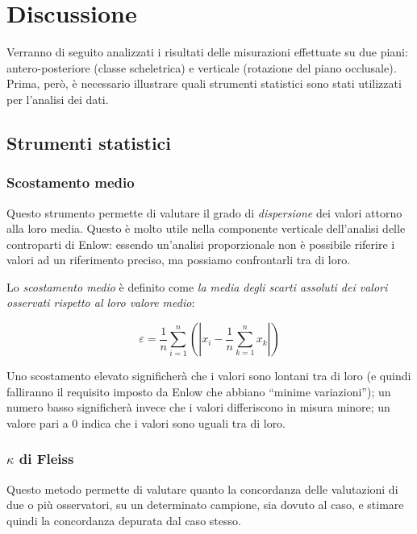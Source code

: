 \chapter{Discussione}
Verranno di seguito analizzati i risultati delle misurazioni effettuate su due piani:  antero-posteriore (classe scheletrica) e verticale (rotazione del piano occlusale). Prima, però, è necessario illustrare quali strumenti statistici sono stati utilizzati per l'analisi dei dati.

\section{Strumenti statistici}
\subsection*{Scostamento medio}
\label{scostamento_medio}
Questo strumento permette di valutare il grado di \emph{dispersione} dei valori attorno alla loro media. Questo è molto utile nella componente verticale dell'analisi delle controparti di Enlow: essendo un'analisi proporzionale non è possibile riferire i valori ad un riferimento preciso, ma possiamo confrontarli tra di loro.

Lo \emph{scostamento medio} è definito come \emph{la media degli scarti assoluti dei valori osservati rispetto al loro valore medio}:

\begin{equation}
\label{eq:scostamento_medio}
\varepsilon = \frac{1}{n}\sum_{i=1}^n{\left(\left|x_i - \frac{1}{n}\sum_{k=1}^n x_k\right|\right)}
\end{equation}

Uno scostamento elevato significherà che i valori sono lontani tra di loro (e quindi falliranno il requisito imposto da Enlow che abbiano ``minime variazioni''); un numero basso significherà invece che i valori differiscono in misura minore; un valore pari a 0 indica che i valori sono uguali tra di loro.

\subsection*{$\kappa$ di Fleiss}
Questo metodo permette di valutare quanto la concordanza delle valutazioni di due o più osservatori, su un determinato campione, sia dovuto al caso, e stimare quindi la concordanza depurata dal caso stesso.


